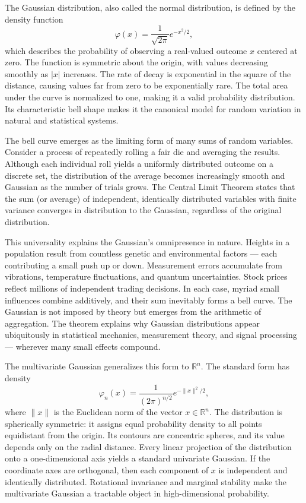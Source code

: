 The Gaussian distribution, also called the normal distribution, is defined by the density function
\[
\varphi(x) = \frac{1}{\sqrt{2\pi}} e^{-x^2/2},
\]
which describes the probability of observing a real-valued outcome \( x \) centered at zero. The function is symmetric about the origin, with values decreasing smoothly as \( |x| \) increases. The rate of decay is exponential in the square of the distance, causing values far from zero to be exponentially rare. The total area under the curve is normalized to one, making it a valid probability distribution. Its characteristic bell shape makes it the canonical model for random variation in natural and statistical systems.

The bell curve emerges as the limiting form of many sums of random variables. Consider a process of repeatedly rolling a fair die and averaging the results. Although each individual roll yields a uniformly distributed outcome on a discrete set, the distribution of the average becomes increasingly smooth and Gaussian as the number of trials grows. The Central Limit Theorem states that the sum (or average) of independent, identically distributed variables with finite variance converges in distribution to the Gaussian, regardless of the original distribution. 

This universality explains the Gaussian's omnipresence in nature. Heights in a population result from countless genetic and environmental factors — each contributing a small push up or down. Measurement errors accumulate from vibrations, temperature fluctuations, and quantum uncertainties. Stock prices reflect millions of independent trading decisions. In each case, myriad small influences combine additively, and their sum inevitably forms a bell curve. The Gaussian is not imposed by theory but emerges from the arithmetic of aggregation. The theorem explains why Gaussian distributions appear ubiquitously in statistical mechanics, measurement theory, and signal processing — wherever many small effects compound.

The multivariate Gaussian generalizes this form to \( \mathbb{R}^n \). The standard form has density
\[
\varphi_n(x) = \frac{1}{(2\pi)^{n/2}} e^{-\|x\|^2/2},
\]
where \( \|x\| \) is the Euclidean norm of the vector \( x \in \mathbb{R}^n \). The distribution is spherically symmetric: it assigns equal probability density to all points equidistant from the origin. Its contours are concentric spheres, and its value depends only on the radial distance. Every linear projection of the distribution onto a one-dimensional axis yields a standard univariate Gaussian. If the coordinate axes are orthogonal, then each component of \( x \) is independent and identically distributed. Rotational invariance and marginal stability make the multivariate Gaussian a tractable object in high-dimensional probability.

